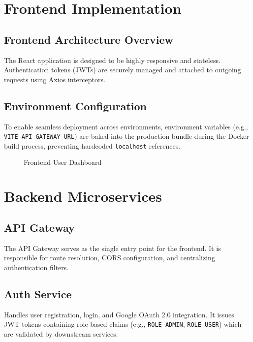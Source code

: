 \documentclass[12pt,a4paper]{report}
\begin{document}
\chapter{Frontend Implementation}

\section{Frontend Architecture Overview}
The React application is designed to be highly responsive and stateless. Authentication tokens (JWTs) are securely managed and attached to outgoing requests using Axios interceptors.

\section{Environment Configuration}
To enable seamless deployment across environments, environment variables (e.g., \texttt{VITE\_API\_GATEWAY\_URL}) are baked into the production bundle during the Docker build process, preventing hardcoded \texttt{localhost} references.

\begin{figure}[H]
    \centering
    \caption{Frontend User Dashboard}
\end{figure}

\chapter{Backend Microservices}

\section{API Gateway}
The API Gateway serves as the single entry point for the frontend. It is responsible for route resolution, CORS configuration, and centralizing authentication filters.

\section{Auth Service}
Handles user registration, login, and Google OAuth 2.0 integration. It issues JWT tokens containing role-based claims (e.g., \texttt{ROLE\_ADMIN}, \texttt{ROLE\_USER}) which are validated by downstream services.
\end{document}
